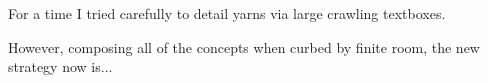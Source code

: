 For %
a %
time %
I %
tried %
carefully %
to %
detail %
yarns %
via %
large %
crawling %
textboxes. %

However, %
composing %
all %
of %
the %
concepts %
when %
curbed %
by %
finite %
room, %
the %
new %
strategy %
now %
is... %

